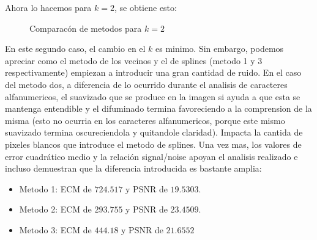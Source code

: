 Ahora lo hacemos para $k=2$, se obtiene esto:

\begin{figure}[H]
    \centering
    \qquad
    \qquad
    \caption{Comparacón de metodos para $k = 2$}
    \label{fig:example}%
\end{figure}

En este segundo caso, el cambio en el $k$ es minimo. Sin embargo, podemos apreciar como el metodo de los vecinos y el de splines (metodo 1 y 3 respectivamente) empiezan a introducir una gran cantidad de ruido. En el caso del metodo dos, a diferencia de lo ocurrido durante el analisis de caracteres alfanumericos, el suavizado que se produce en la imagen si ayuda a que esta se mantenga entendible y el difuminado termina favoreciendo a la comprension de la misma (esto no ocurria en los caracteres alfanumericos, porque este mismo suavizado termina oscureciendola y quitandole claridad). Impacta la cantida de pixeles blancos que introduce el metodo de splines.
Una vez mas, los valores de error cuadrático medio y la relación signal/noise apoyan el analisis realizado e incluso demuestran que la diferencia introducida es bastante amplia:
\begin{itemize}
 \item Metodo 1: ECM de $724.517$ y PSNR de $19.5303$.
 \item Metodo 2: ECM de $293.755$ y PSNR de $23.4509$.
 \item Metodo 3: ECM de $444.18$ y PSNR de $21.6552$
\end{itemize}


